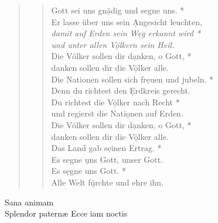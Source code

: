 \def\greinitialformat#1{{\fontsize{40}{40}\selectfont #1}}
\gresetfirstlineaboveinitial{\small \textcolor{red}{Ps 67}}{}
\setaboveinitialseparation{0.72mm}


\vspace{0.3cm}
\begin{quote}
 
\begin{verse}
 Gott sei uns gn\d ädig und segne uns.  *\\ 
Er lasse über uns sein \d Angesicht leuchten,\\ \vin
\textit{damit auf Erden sein W\d eg erkannt wird *\\ \vin 
und unter allen V\d ölkern sein Heil.}\\ 
Die Völker sollen dir d\d anken, o Gott, *\\ 
danken sollen dir die V\d ölker alle.\\ \vin 
Die Nationen sollen sich fr\d euen und jubeln. *\\ \vin 
Denn du richtest den \d Erdkreis gerecht.\\  
Du richtest die V\d ölker nach Recht *\\  
und regierst die Nati\d onen auf Erden.\\ \vin  
Die Völker sollen dir d\d anken, o Gott, *\\ \vin 
danken sollen dir die V\d ölker alle.\\ 
Das Land gab s\d einen Ertrag.  *\\ 
Es segne \d uns Gott, unser Gott.\\ \vin  
Es s\d egne uns Gott.  *\\ \vin 
Alle Welt f\d ürchte und ehre ihn.\\  


\end{verse}
\end{quote}

\noindent{} Sana animam \\
\noindent{} Splendor paternæ  Ecce iam noctis 
\begin{flushleft}


\medskip

{\rm{
}}
\end{flushleft}

